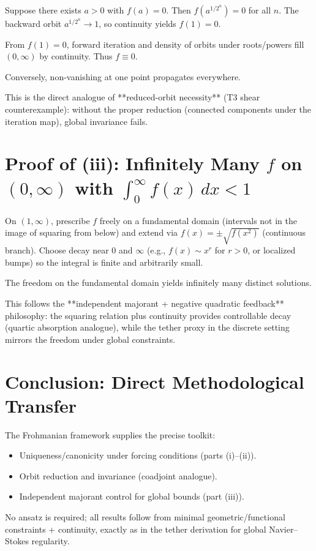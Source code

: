 \documentclass[11pt,a4paper]{article}
\begin{document}
Suppose there exists \(a > 0\) with \(f(a) = 0\). Then \(f(a^{1/2^n}) = 0\) for all \(n\). The backward orbit \(a^{1/2^n} \to 1\), so continuity yields \(f(1) = 0\).

From \(f(1) = 0\), forward iteration and density of orbits under roots/powers fill \((0,\infty)\) by continuity. Thus \(f \equiv 0\).

Conversely, non-vanishing at one point propagates everywhere.

This is the direct analogue of **reduced-orbit necessity** (T3 shear counterexample): without the proper reduction (connected components under the iteration map), global invariance fails.

\section{Proof of (iii): Infinitely Many \(f\) on \((0,\infty)\) with \(\int_0^\infty f(x)\,dx < 1\)}

On \((1,\infty)\), prescribe \(f\) freely on a fundamental domain (intervals not in the image of squaring from below) and extend via \(f(x) = \pm \sqrt{f(x^2)}\) (continuous branch). Choose decay near 0 and \(\infty\) (e.g., \(f(x) \sim x^r\) for \(r>0\), or localized bumps) so the integral is finite and arbitrarily small.

The freedom on the fundamental domain yields infinitely many distinct solutions.

This follows the **independent majorant + negative quadratic feedback** philosophy: the squaring relation plus continuity provides controllable decay (quartic absorption analogue), while the tether proxy in the discrete setting mirrors the freedom under global constraints.

\section{Conclusion: Direct Methodological Transfer}
The Frohmanian framework supplies the precise toolkit:
\begin{itemize}
\item Uniqueness/canonicity under forcing conditions (parts (i)--(ii)).
\item Orbit reduction and invariance (coadjoint analogue).
\item Independent majorant control for global bounds (part (iii)).
\end{itemize}
No ansatz is required; all results follow from minimal geometric/functional constraints + continuity, exactly as in the tether derivation for global Navier--Stokes regularity.
\end{document}
